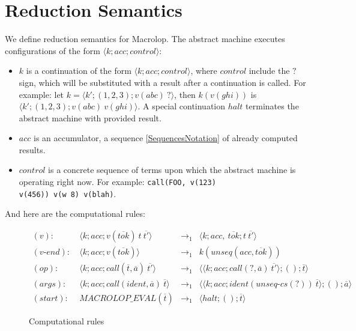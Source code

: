 \documentclass[12pt]{article}
\theoremstyle{break}
\begin{document}
\section{Reduction Semantics}

We define reduction semantics for Macrolop. The abstract machine executes configurations
of the form $\langle k; acc; control \rangle$:

\begin{itemize}
    \item $k$ is a continuation of the form $\langle k; acc; control \rangle$, where
    $control$ include the $?$ sign, which will be substituted with a result after a
    continuation is called. For example: let $k = \langle k'; (1, 2, 3); v(abc) \ ? \rangle$,
    then $k(v(ghi))$ is $\langle k'; (1, 2, 3); v(abc) \ v(ghi) \rangle$. A special
    continuation $halt$ terminates the abstract machine with provided result.

    \item $acc$ is an accumulator, a sequence \ref{SequencesNotation} of already computed
    results.

    \item $control$ is a concrete sequence of terms upon which the abstract machine is
    operating right now. For example: \texttt{call(FOO, v(123) \\ v(456)) v(w 8) v(blah)}.
\end{itemize}

And here are the computational rules:

\begin{figure}[H]
    \caption{Computational rules}

    \small
    \begin{align*}
        (v): \ & \langle k; acc; v(\overline{tok}) \ t \ \overline{t'} \rangle & \to_1 &
            \langle k; acc, \ \overline{tok}; t \ \overline{t'} \rangle \\
        (v\mbox{-}end): \ & \langle k; acc; v(\overline{tok}) \rangle & \to_1 &
            k(unseq(acc, \overline{tok})) \\
        (op): \ & \langle k; acc; call(\overline{t}, \overline{a}) \ \overline{t'} \rangle & \to_1 &
            \langle \langle k; acc; call(?, \overline{a}) \ \overline{t'} \rangle; (); \overline{t} \rangle \\
        (args): \ & \langle k; acc; call(ident, \overline{a}) \ \overline{t} \rangle & \to_1 &
            \langle \langle k; acc; ident(unseq\mbox{-}cs(?)) \ \overline{t} \rangle; (); \overline{a} \rangle \\
        (start): \ & MACROLOP\_EVAL(\overline{t}) & \to_1 &
            \langle halt; (); \overline{t} \rangle
    \end{align*}
    \normalsize
\end{figure}
\end{document}
